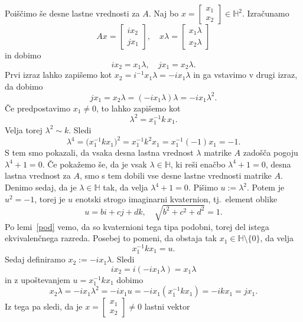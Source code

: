 \documentclass[mat1, tisk]{fmfdelo}
\numberwithin{equation}{section}
\begin{document}
\begin{zgled}
\begin{enumerate}
        Poiščimo še desne lastne vrednosti za $A$.
        Naj bo $x=\begin{bmatrix}x_1\\x_2\end{bmatrix} \in \mathbb{H}^{2}$. Izračunamo
        \[
        A x 
        =
        \begin{bmatrix}
        i x_2 \\ j x_1
        \end{bmatrix},
        \quad
        x \lambda =
        \begin{bmatrix}
        x_1 \lambda \\ x_2 \lambda
        \end{bmatrix}
        \]
        in dobimo
        \[
        i x_2 = x_1\lambda,\quad j x_1 = x_2\lambda. 
        \]
        Prvi izraz lahko zapišemo kot
        $
        x_2 = i^{-1} x_1\lambda = -i x_1\lambda 
        $
        in ga vstavimo v drugi izraz, da dobimo
        \[
        j x_1 = x_2\lambda = (-i x_1\lambda)\lambda = -i x_1\lambda^2.
        \]
        Če predpostavimo $x_1 \neq 0$, to lahko zapišemo kot
        $$
        \lambda^2 = x_1^{-1}k\,x_1.
        $$
        Velja torej \(\lambda^2 \sim k\). Sledi
        \[
        \lambda^4 = \big(x_1^{-1}k x_1\big)^2 = x_1^{-1}k^2 x_1 = x_1^{-1}(-1)x_1 = -1.
        \]
        S tem smo pokazali, da vsaka desna lastna vrednost \(\lambda\) matrike $A$ zadošča pogoju \(\lambda^4+1=0\). Če pokažemo še, da je
        vsak $\lambda \in \mathbb{H}$, ki reši enačbo $\lambda^4+1=0$, desna lastna vrednost za $A$, smo s tem dobili vse desne lastne vrednosti
        matrike $A$. Denimo sedaj, da je $\lambda \in \mathbb{H}$ tak, da velja $\lambda^4+1=0$.
        Pišimo \(u:=\lambda^2\). Potem je \(u^2=-1\), torej je \(u\) enotski strogo imaginarni kvaternion, tj.\ element oblike
        $$u=bi+cj+dk, \quad \sqrt{b^2 + c^2 + d^2} = 1.$$
        Po lemi~\ref{pod} vemo, da so kvaternioni tega tipa podobni, torej del istega ekvivalenčnega razreda. Posebej to pomeni, da obstaja tak \(x_1 \in 
        \mathbb{H}\setminus\{0\}\), da velja
        \[
        x_1^{-1}k x_1 = u.
        \]
        Sedaj definiramo
        $
        x_2 := -i x_1\lambda.
        $
        Sledi
        \[
        i x_2 = i(-i x_1\lambda) = x_1\lambda
        \]
        in z upoštevanjem \(u=x_1^{-1}k x_1\) dobimo
        \[
        x_2\lambda = -i x_1\lambda^2 = -i x_1 u = -i x_1(x_1^{-1}k x_1) = -i k x_1 = j x_1.
        \]
        Iz tega pa sledi, da je \(x= \begin{bmatrix} x_1 \\ x_2 \end{bmatrix} \neq 0\) lastni vektor

\end{enumerate}
\end{zgled}
\end{document}
